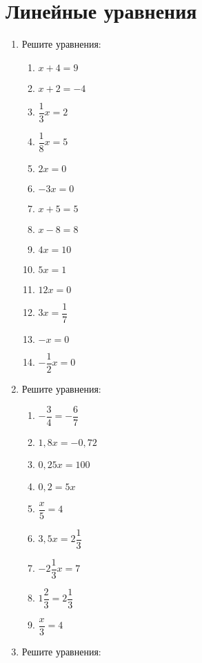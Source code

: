 \documentclass[10pt, a4paper]{article}
\begin{document}
		

\section{Линейные уравнения}

\begin{enumerate}
	\item Решите уравнения:
	\begin{multicols}{4}
		\begin{enumerate}[label=\asbuk*)]
			\item $x+4=9$
			\item $x+2=-4$
			\item $\dfrac{1}{3}x=2$
			\item $\dfrac{1}{8}x=5$
			\item $2x=0$
			\item $-3x=0$
			\item $x+5=5$
			\item $x-8=8$
			\item $4x=10$
			\item $5x=1$
			\item $12x=0$
			\item $3x=\dfrac{1}{7}$
			\item $-x=0$
			\item $-\dfrac{1}{2}x=0$
		\end{enumerate}
	\end{multicols}
	\item Решите уравнения:
	\begin{multicols}{3}
		\begin{enumerate}[label=\asbuk*)]
			\item $-\dfrac{3}{4}=-\dfrac{6}{7}$
			\item $1,8x=-0,72$
			\item $0,25x=100$
			\item $0,2=5x$
			\item $\dfrac{x}{5}=4$
			\item $3,5x=2\dfrac{1}{3}$
			\item $-2\dfrac{1}{3}x=7$
			\item $1\dfrac{2}{3}=2\dfrac{1}{3}$
			\item $\dfrac{x}{3}=4$
		\end{enumerate}
	\end{multicols}
	\item Решите уравнения:
	\begin{multicols}{3}
		\begin{enumerate}[label=\asbuk*)]

\end{enumerate}
\end{multicols}
\end{enumerate}
\end{document}

